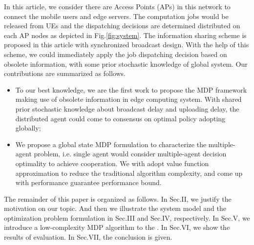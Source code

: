 In this article, we consider there are Access Points (APs) in this network to connect the mobile users and edge servers.
The computation jobs would be released from UEs and the dispatching decisions are determined distributed on each AP nodes as depicted in Fig.\ref{fig:system}.
The information sharing scheme is proposed in this article with synchronized broadcast design. With the help of this scheme, we could immediately apply the job dispatching decision based on obsolete information, with some prior stochastic knowledge of global system.
Our contributions are summarized as follows.
\begin{itemize}
    \item To our best knowledge, we are the first work to propose the MDP framework making use of obsolete information in edge computing system. With shared prior stochastic knowledge about broadcast delay and uploading delay, the distributed agent could come to consensus on optimal policy adopting globally;
    \item We propose a global state MDP formulation to characterize the multiple-agent problem, i.e. single agent would consider multiple-agent decision optimality to achieve cooperation.
    We with adopt value function approximation to reduce the traditional algorithm complexity, and come up with performance guarantee performance bound.
\end{itemize}


The remainder of this paper is organized as follows.
In Sec.II, we justify the motivation on our topic.
And then we illustrate the system model and the optimization problem formulation in Sec.III and Sec.IV, respectively.
In Sec.V, we introduce a low-complexity MDP algorithm to the .
In Sec.VI, we show the results of evaluation.
In Sec.VII, the conclusion is given.